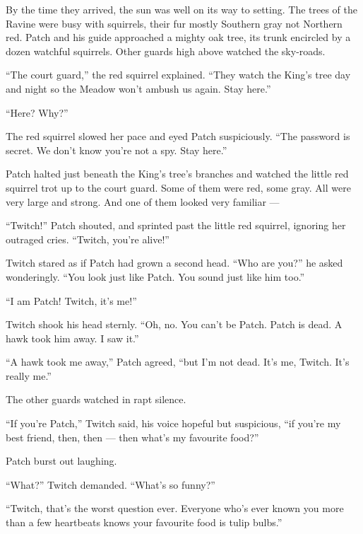 \documentclass[ebook,oneside,openany,17pt]{memoir}
\newenvironment{tolerant}[1]{%
  \par\tolerance=#1\relax
}{%
  \par
}
\begin{document}
\begin{tolerant}{1000}
By the time they arrived, the sun was well on its way to setting. The
trees of the Ravine were busy with squirrels, their fur mostly
Southern gray not Northern red. Patch and his guide approached a
mighty oak tree, its trunk encircled by a dozen watchful
squirrels. Other guards high above watched the sky-roads.
\end{tolerant}

\begin{tolerant}{1000}
“The court guard,” the red squirrel explained. “They watch the King’s
tree day and night so the Meadow won’t ambush us again. Stay here.”
\end{tolerant}

“Here? Why?”

The red squirrel slowed her pace and eyed Patch suspiciously. “The
password is secret. We don’t know you’re not a spy. Stay here.”

Patch halted just beneath the King’s tree’s branches and watched the
little red squirrel trot up to the court guard. Some of them were red,
some gray. All were very large and strong. And one of them looked very
familiar —

\begin{tolerant}{5000}
“Twitch!” Patch shouted, and sprinted past the little red squirrel,
ignoring her outraged cries. “Twitch, you’re alive!”
\end{tolerant}

Twitch stared as if Patch had grown a second head. “Who are you?” he
asked wonderingly. “You look just like Patch. You sound just like him
too.”

“I am Patch! Twitch, it’s me!”

Twitch shook his head sternly. “Oh, no. You can’t be Patch. Patch is
dead. A hawk took him away. I saw it.”

“A hawk took me away,” Patch agreed, “but I’m not dead. It’s me,
Twitch. It’s really me.”

The other guards watched in rapt silence.

“If you’re Patch,” Twitch said, his voice hopeful but suspicious, “if
you’re my best friend, then, then — then what’s my favourite food?”

Patch burst out laughing.

“What?” Twitch demanded. “What’s so funny?”

“Twitch, that’s the worst question ever. Everyone who’s ever known you
more than a few heartbeats knows your favourite food is tulip bulbs.”
\end{document}
